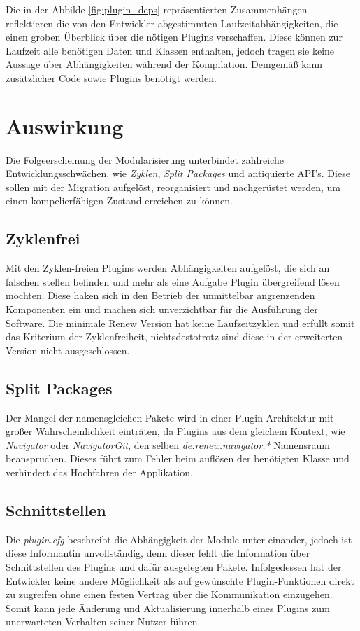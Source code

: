 Die in der Abbilde \ref{fig:plugin_deps} repräsentierten Zusammenhängen reflektieren die von den Entwickler abgestimmten Laufzeitabhängigkeiten, die einen groben Überblick über die nötigen Plugins verschaffen. Diese können zur Laufzeit alle benötigen Daten und Klassen enthalten, jedoch tragen sie keine Aussage über Abhängigkeiten während der Kompilation. Demgemäß kann zusätzlicher Code sowie Plugins benötigt werden. 


\section{Auswirkung} \label{auswirkung}
Die Folgeerscheinung der Modularisierung unterbindet zahlreiche Entwicklungsschwächen, wie \textit{Zyklen}, \textit{Split Packages} und antiquierte API's. Diese sollen mit der Migration aufgelöst, reorganisiert und nachgerüstet werden, um einen kompelierfähigen Zustand erreichen zu können.

\subsection{Zyklenfrei} 
Mit den Zyklen-freien Plugins werden Abhängigkeiten aufgelöst, die sich an falschen stellen befinden und mehr als eine Aufgabe Plugin übergreifend lösen möchten. Diese haken sich in den Betrieb der unmittelbar angrenzenden Komponenten ein und machen sich unverzichtbar für die Ausführung der Software. Die minimale Renew Version hat keine Laufzeitzyklen und erfüllt somit das Kriterium der Zyklenfreiheit, nichtsdestotrotz sind diese in der erweiterten Version nicht ausgeschlossen.

\subsection{Split Packages}
Der Mangel der namensgleichen Pakete wird in einer Plugin-Architektur mit großer Wahrscheinlichkeit einträten, da Plugins aus dem gleichem Kontext, wie \textit{Navigator} oder \textit{NavigatorGit}, den selben \textit{de.renew.navigator.*} Namensraum beanspruchen. Dieses führt zum Fehler beim auflösen der benötigten Klasse und verhindert das Hochfahren der Applikation. 

\subsection{Schnittstellen}
Die \textit{plugin.cfg} beschreibt die Abhängigkeit der Module unter einander, jedoch ist diese Informantin unvollständig, denn dieser fehlt die Information über Schnittstellen des Plugins und dafür ausgelegten Pakete. Infolgedessen hat der Entwickler keine andere Möglichkeit als auf gewünschte Plugin-Funktionen direkt zu zugreifen ohne einen festen Vertrag über die Kommunikation einzugehen. Somit kann jede Änderung und Aktualisierung innerhalb eines Plugins zum unerwarteten Verhalten seiner Nutzer führen. 


